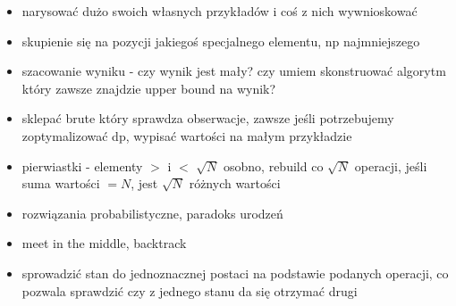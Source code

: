 \begin{itemize}[noitemsep]
	\item narysować dużo swoich własnych przykładów i coś z nich wywnioskować
	\item skupienie się na pozycji jakiegoś specjalnego elementu, np najmniejszego
	\item szacowanie wyniku - czy wynik jest mały? czy umiem skonstruować algorytm który zawsze znajdzie upper bound na wynik?
	\item sklepać brute który sprawdza obserwacje, zawsze jeśli potrzebujemy zoptymalizować dp, wypisać wartości na małym przykładzie
	\item pierwiastki - elementy $>$ i $<$ $\sqrt{N}$ osobno, rebuild co $\sqrt{N}$ operacji, jeśli suma wartości $=N$, jest $\sqrt{N}$ różnych wartości
	\item rozwiązania probabilistyczne, paradoks urodzeń
	\item meet in the middle, backtrack
	\item sprowadzić stan do jednoznacznej postaci na podstawie podanych operacji, co pozwala sprawdzić czy z jednego stanu da się otrzymać drugi
\end{itemize}
